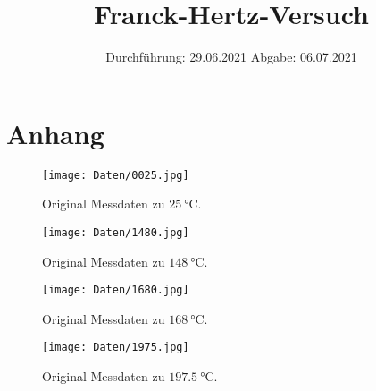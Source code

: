 

\subject{V601}
\title{Franck-Hertz-Versuch}
\date{%
  Durchführung: 29.06.2021
  \hspace{3em}
  Abgabe: 06.07.2021
}



\maketitle
\thispagestyle{empty}
\tableofcontents
\newpage






\printbibliography{}

\appendix
\section{Anhang}
\label{sec:Anhang}

\begin{figure}
	\texttt{[image: Daten/0025.jpg]}
	\caption{Original Messdaten zu $\SI{25}{\celsius}$.}
\end{figure}
\begin{figure}
	\texttt{[image: Daten/1480.jpg]}
	\caption{Original Messdaten zu $\SI{148}{\celsius}$.}
\end{figure}
\begin{figure}
	\texttt{[image: Daten/1680.jpg]}
	\caption{Original Messdaten zu $\SI{168}{\celsius}$.}
\end{figure}
\begin{figure}
	\texttt{[image: Daten/1975.jpg]}
	\caption{Original Messdaten zu $\SI{197.5}{\celsius}$.}
\end{figure}


